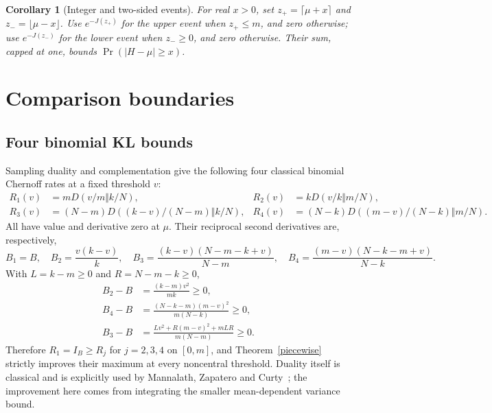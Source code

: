 \documentclass[11pt]{article}
\newtheorem{corollary}[theorem]{Corollary}
\begin{document}
\begin{corollary}[Integer and two-sided events]
For real $x>0$, set
$z_+=\lceil\mu+x\rceil$ and $z_-=\lfloor\mu-x\rfloor$.
Use $e^{-J(z_+)}$ for the upper event when $z_+\le m$, and zero otherwise;
use $e^{-J(z_-)}$ for the lower event when $z_-\ge0$, and zero otherwise.
Their sum, capped at one, bounds $\Pr(|H-\mu|\ge x)$.
\end{corollary}

\section{Comparison boundaries}
\subsection{Four binomial KL bounds}
Sampling duality and complementation give the following four classical
binomial Chernoff rates at a fixed threshold $v$:
\begin{align*}
 R_1(v)&=mD(v/m\Vert k/N),&
 R_2(v)&=kD(v/k\Vert m/N),\\
 R_3(v)&=(N-m)D((k-v)/(N-m)\Vert k/N),&
 R_4(v)&=(N-k)D((m-v)/(N-k)\Vert m/N).
\end{align*}
All have value and derivative zero at $\mu$. Their reciprocal second
derivatives are, respectively,
\[
 B_1=B,\quad B_2=\frac{v(k-v)}k,\quad
 B_3=\frac{(k-v)(N-m-k+v)}{N-m},\quad
 B_4=\frac{(m-v)(N-k-m+v)}{N-k}.
\]
With $L=k-m\ge0$ and $R=N-m-k\ge0$,
\begin{align*}
 B_2-B&=\frac{(k-m)v^2}{mk}\ge0,\\
 B_4-B&=\frac{(N-k-m)(m-v)^2}{m(N-k)}\ge0,\\
 B_3-B&=\frac{Lv^2+R(m-v)^2+mLR}{m(N-m)}\ge0.
\end{align*}
Therefore $R_1=I_B\ge R_j$ for $j=2,3,4$ on $[0,m]$, and
Theorem~\ref{piecewise} strictly improves their maximum at every
noncentral threshold. Duality itself is classical and is explicitly used
by Mannalath, Zapatero and Curty~\cite{MZC}; the improvement here comes
from integrating the smaller mean-dependent variance bound.
\end{document}
